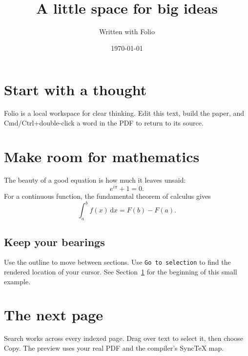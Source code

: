 \documentclass[11pt]{article}
\title{A little space for big ideas}
\author{Written with Folio}
\date{\today}
\begin{document}
\maketitle

\section{Start with a thought}
\label{sec:start}
Folio is a local workspace for clear thinking. Edit this text, build the
paper, and Cmd/Ctrl+double-click a word in the PDF to return to its source.

\section{Make room for mathematics}
The beauty of a good equation is how much it leaves unsaid:
\begin{equation}
  e^{i\pi} + 1 = 0.
\end{equation}
For a continuous function, the fundamental theorem of calculus gives
\[
  \int_a^b f(x)\,\mathrm{d}x = F(b) - F(a).
\]

\subsection{Keep your bearings}
Use the outline to move between sections. Use \texttt{Go to selection} to find
the rendered location of your cursor. See Section~\ref{sec:start} for the
beginning of this small example.

\newpage
\section{The next page}
Search works across every indexed page. Drag over text to select it, then
choose Copy. The preview uses your real PDF and the compiler's SyncTeX map.
\end{document}
